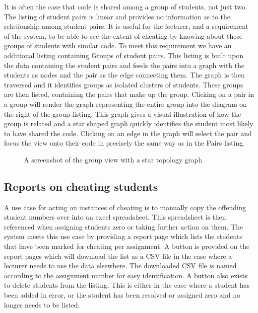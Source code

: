 \documentclass[11pt,a4paper]{article}
\begin{document}
It is often the case that code is shared among a group of students, not just
two. The listing of student pairs is linear and provides no information as to
the relationship among student pairs. It is useful for the lecturer, and a
requirement of the system, to be able to see the extent of cheating by knowing
about these groups of students with similar code. To meet this requirement we
have an additional listing containing Groups of student pairs. This listing is
built upon the data containing the student pairs and feeds the pairs into a
graph with the students as nodes and the pair as the edge connecting them. The
graph is then traversed and it identifies groups as isolated clusters of
students. These groups are then listed, containing the pairs that make up the group. Clicking on a pair in a group will render the graph representing the entire group into the diagram on the right of the group listing. This graph gives a visual illustration of how the group is related and a star shaped graph quickly identifies the student most likely to have shared the code. Clicking on an edge in the graph will select the pair and focus the view onto their code in precisely the same way as in the Pairs listing.

\begin{figure}[H]
  \caption{A screenshot of the group view with a star topology graph}
  \label{fig:graphview}
\end{figure}

\subsection{Reports on cheating students}

A use case for acting on instances of cheating is to manually copy the offending
student numbers over into an excel spreadsheet. This spreadsheet is then
referenced when assigning students zero or taking further action on them. The
system meets this use case by providing a report page which lists the students
that have been marked for cheating per assignment. A button is provided on the report pages which will download the list as a CSV file in the case where a lecturer needs to use the data elsewhere. The downloaded CSV file is named according to the assignment number for easy identification. A button also exists to delete students from the listing. This is either in the case where a student has been added in error, or the student has been resolved or assigned zero and no longer needs to be listed.
\end{document}
